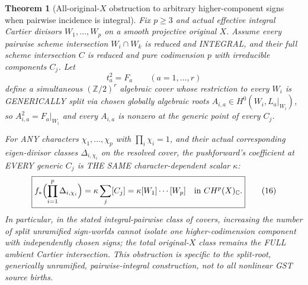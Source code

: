 \documentclass[11pt]{article}
\newtheorem{theorem}{Theorem}
\begin{document}
\begin{theorem}[All-original-$X$ obstruction to arbitrary higher-component signs when pairwise incidence is integral]
Fix $p\ge3$ and actual effective integral
Cartier divisors $W_1,\ldots,W_p$ on a smooth
projective original $X$. Assume every
pairwise scheme intersection $W_i\cap W_k$
is reduced and INTEGRAL, and their full
scheme intersection $C$ is reduced and
pure codimension $p$ with irreducible
components $C_j$. Let
\[
 t_a^2=F_a\qquad(a=1,\ldots,r)
\]
define a simultaneous $(\mathbb Z/2)^r$
algebraic cover whose restriction to
every $W_i$ is GENERICALLY split via
chosen globally algebraic roots
$A_{i,a}\in H^0(W_i,L_a|_{W_i})$,
so $A_{i,a}^2=F_a|_{W_i}$ and every
$A_{i,a}$ is nonzero at the generic point
of every $C_j$.

For ANY characters $\chi_1,\ldots,\chi_p$
with $\prod_i\chi_i=1$,
and their actual corresponding
eigen-divisor classes
$\Delta_{i,\chi_i}$ on the resolved cover,
the pushforward's coefficient at
EVERY generic $C_j$ is THE SAME
character-dependent scalar $\kappa$:
\[
 \boxed{
  f_*\Bigl(\prod_{i=1}^{p}
                  \Delta_{i,\chi_i}\Bigr)
     =\kappa\sum_j[C_j]
     =\kappa[W_1]\cdots[W_p]
        \quad\text{in } CH^p(X)_{\mathbb C}.} \tag{16}
\]
In particular, in the stated integral-pairwise
class of covers, increasing the number of
split unramified sign-worlds cannot isolate
one higher-codimension component with
independently chosen signs; the total
original-$X$ class remains the FULL ambient
Cartier intersection.
This obstruction is specific to the
split-root, generically unramified,
pairwise-integral construction, not to
all nonlinear GST source births.
\end{theorem}
\end{document}
